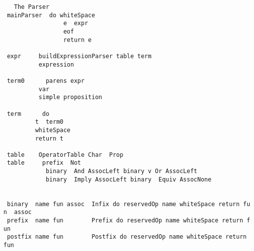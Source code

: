 \documentclass{article}
\begin{document}
\begin{tabbing}\tt
~~The~Parser\\
\tt ~mainParser~~do~whiteSpace\\
\tt ~~~~~~~~~~~~~~~~~e~~expr\\
\tt ~~~~~~~~~~~~~~~~~eof\\
\tt ~~~~~~~~~~~~~~~~~return~e\\
\tt ~\\
\tt ~expr~~~~~buildExpressionParser~table~term\\
\tt ~~~~~~~~~~expression\\
\tt ~\\
\tt ~term0~~~~~~parens~expr\\
\tt ~~~~~~~~~~var\\
\tt ~~~~~~~~~~simple~proposition\\
\tt ~\\
\tt ~term~~~~~~do\\
\tt ~~~~~~~~~t~~term0\\
\tt ~~~~~~~~~whiteSpace\\
\tt ~~~~~~~~~return~t\\
\tt ~\\
\tt ~table~~~~OperatorTable~Char~~Prop\\
\tt ~table~~~~~prefix~~Not~\\
\tt ~~~~~~~~~~~~binary~~And~AssocLeft~binary~v~Or~AssocLeft~\\
\tt ~~~~~~~~~~~~binary~~Imply~AssocLeft~binary~~Equiv~AssocNone~\\
\tt ~~~~~~~~~~~\\
\tt ~\\
\tt ~binary~~name~fun~assoc~~Infix~do~reservedOp~name~whiteSpace~return~fun~~assoc\\
\tt ~prefix~~name~fun~~~~~~~~Prefix~do~reservedOp~name~whiteSpace~return~fun~\\
\tt ~postfix~name~fun~~~~~~~~Postfix~do~reservedOp~name~whiteSpace~return~fun~\\

\end{tabbing}
\end{document}
